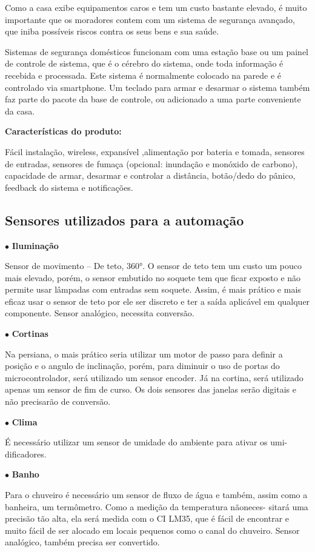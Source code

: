 	Como a casa exibe equipamentos caros e tem um custo bastante elevado, é muito importante que os moradores contem com um sistema de segurança avançado, que iniba possíveis riscos contra os seus bens e sua saúde.

	Sistemas de segurança domésticos funcionam com uma estação base ou um painel de controle de sistema, que é o cérebro do sistema, onde toda informação é recebida e processada. Este sistema é normalmente colocado na parede e é controlado via smartphone. Um teclado para armar e desarmar o sistema também faz parte do pacote da base de controle, ou adicionado a uma parte conveniente da casa.

\textbf{Características do produto:}

	Fácil instalação, wireless, expansível ,alimentação por bateria e tomada, sensores de entradas, sensores de fumaça (opcional: inundação e monóxido de carbono), capacidade de armar, desarmar e controlar a distância, botão/dedo do pânico, feedback do sistema e notificações.


\subsection{Sensores utilizados para a automação}

$\bullet$ \textbf{Iluminação}

	Sensor de movimento – De teto, 360°. O sensor de teto tem um custo um pouco mais elevado, porém, o sensor embutido no soquete tem que ficar exposto e não permite usar lâmpadas com entradas sem soquete. Assim, é mais prático e mais eficaz usar o sensor de teto por ele ser discreto e ter a saída aplicável em qualquer componente. Sensor analógico, necessita conversão.

$\bullet$ \textbf{Cortinas}

	Na persiana, o mais prático seria utilizar um motor de passo para definir a posição e o angulo de inclinação, porém, para diminuir o uso de portas do microcontrolador, será utilizado um sensor encoder. Já na cortina, será utilizado apenas um sensor de fim de curso. Os dois sensores das janelas serão digitais e não precisarão de conversão.

$\bullet$ \textbf{Clima}

	É necessário utilizar um sensor de umidade do ambiente para ativar os umi- dificadores.
	
$\bullet$ \textbf{Banho}

	Para o chuveiro é necessário um sensor de fluxo de água e também, assim como a banheira, um termômetro. Como a medição da temperatura nãoneces- sitará uma precisão tão alta, ela será medida com o CI LM35, que é fácil de encontrar e muito fácil de ser alocado em locais pequenos como o canal do chuveiro. Sensor analógico, também precisa ser convertido.

